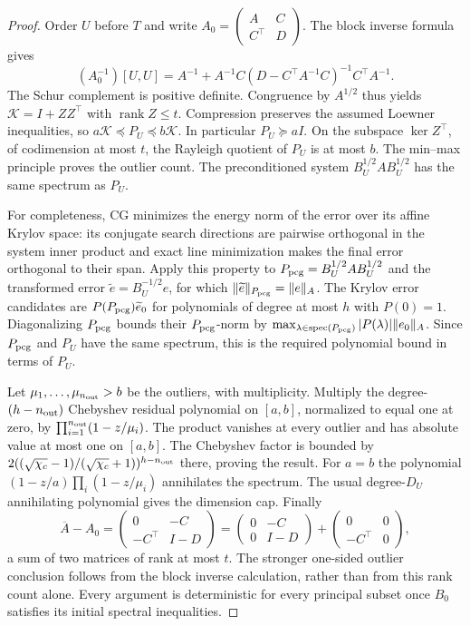 \begin{proof}
Order $U$ before $T$ and write
$A_0=\left(\begin{smallmatrix}A&C\\C^\top&D\end{smallmatrix}\right)$.
The block inverse formula gives
\[
 (A_0^{-1})[U,U]
 =A^{-1}+A^{-1}C(D-C^\top A^{-1}C)^{-1}C^\top A^{-1}.
\]
The Schur complement is positive definite. Congruence by $A^{1/2}$
thus yields $\mathcal K=I+ZZ^\top$ with $\operatorname{rank}Z\leq t$.
Compression preserves the assumed Loewner inequalities, so
$a\mathcal K\preceq P_U\preceq b\mathcal K$. In particular $P_U\succeq aI$.
On the subspace $\ker Z^\top$, of codimension at most $t$,
the Rayleigh quotient of $P_U$ is at most $b$. The min--max
principle proves the outlier count. The preconditioned system
$B_U^{1/2}AB_U^{1/2}$ has the same spectrum as $P_U$.

For completeness, CG minimizes the energy norm of the error over
its affine Krylov space: its conjugate search directions are
pairwise orthogonal in the system inner product and exact line
minimization makes the final error orthogonal to their span.
Apply this property to $P_{\rm pcg}=B_U^{1/2}AB_U^{1/2}$ and the transformed
error $\widetilde e=B_U^{-1/2}e$, for which
$\|\widetilde e\|_{P_{\rm pcg}}=\|e\|_A$. The Krylov error candidates are
$P(P_{\rm pcg})\widetilde e_0$ for polynomials of degree at most $h$ with
$P(0)=1$. Diagonalizing $P_{\rm pcg}$ bounds their $P_{\rm pcg}$-norm by
$\max_{\lambda\in\operatorname{spec}(P_{\rm pcg})}|P(\lambda)|\|e_0\|_A$.
Since $P_{\rm pcg}$ and $P_U$ have the same spectrum, this is the required
polynomial bound in terms of $P_U$.

Let $\mu_1,\ldots,\mu_{n_{\rm out}}>b$ be the outliers, with multiplicity.
Multiply the degree-$(h-n_{\rm out})$ Chebyshev residual polynomial on
$[a,b]$, normalized to equal one at zero, by
$\prod_{i=1}^{n_{\rm out}}(1-z/\mu_i)$. The product vanishes at every outlier
and has absolute value at most one on $[a,b]$. The Chebyshev
factor is bounded by
$2((\sqrt{\chi_c}-1)/(\sqrt{\chi_c}+1))^{h-n_{\rm out}}$ there, proving the result.
For $a=b$ the polynomial $(1-z/a)\prod_i(1-z/\mu_i)$ annihilates
the spectrum. The usual degree-$D_U$ annihilating polynomial gives
the dimension cap. Finally
\[
 \overline A-A_0=
 \begin{pmatrix}0&-C\\-C^\top&I-D\end{pmatrix}
 =\begin{pmatrix}0&-C\\0&I-D\end{pmatrix}
  +\begin{pmatrix}0&0\\-C^\top&0\end{pmatrix},
\]
a sum of two matrices of rank at most $t$. The stronger one-sided
outlier conclusion follows from the block inverse calculation,
rather than from this rank count alone. Every argument is
deterministic for every principal subset once $B_0$ satisfies its
initial spectral inequalities.
\end{proof}

